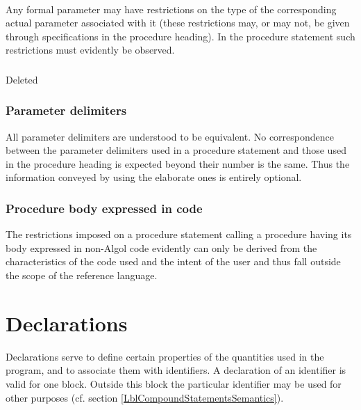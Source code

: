 \documentclass[a4paper,11pt]{article}
\begin{document}
\paragraph{} \label{LblProcedureStatementsRestrictionsP5}
Any formal parameter may have restrictions on the type of the
corresponding actual parameter associated with it (these restrictions
may, or may not, be given through specifications in the procedure
heading).  In the procedure statement such restrictions must evidently
be observed.

\subsubsection{}

Deleted

\subsubsection{Parameter delimiters}
\label{LblProcedureParameterDelimiters}

All parameter delimiters are understood to be equivalent.  No
correspondence between the parameter delimiters used in a procedure
statement and those used in the procedure heading is expected beyond
their number is the same.  Thus the information conveyed by using the
elaborate ones is entirely optional.

\subsubsection{Procedure body expressed in code}
\label{LblProcedureBodyExpressedInCode}

The restrictions imposed on a procedure statement calling a procedure
having its body expressed in non-Algol code evidently can only be
derived from the characteristics of the code used and the intent of
the user and thus fall outside the scope of the reference language.



\section{Declarations}
\label{LblDeclarations}

Declarations serve to define certain properties of the quantities used
in the program, and to associate them with identifiers.  A declaration
of an identifier is valid for one block.  Outside this block the
particular identifier may be used for other purposes (cf. section
\ref{LblCompoundStatementsSemantics}).
\end{document}
